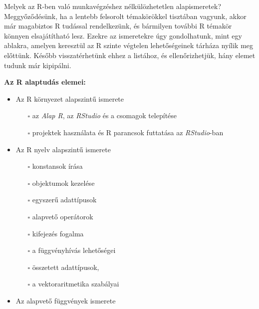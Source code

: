 \documentclass[
]{book}
\providecommand{\tightlist}{%
  \setlength{\itemsep}{0pt}\setlength{\parskip}{0pt}}
\begin{document}
Melyek az R-ben való munkavégzéshez nélkülözhetetlen alapismeretek? Meggyőződésünk, ha a lentebb felsorolt témakörökkel tisztában vagyunk, akkor már magabiztos R tudással rendelkezünk, és bármilyen további R témakör könnyen elsajátítható lesz. Ezekre az ismeretekre úgy gondolhatunk, mint egy ablakra, amelyen keresztül az R szinte végtelen lehetőségeinek tárháza nyílik meg előttünk. Később visszatérhetünk ehhez a listához, és ellenőrizhetjük, hány elemet tudunk már kipipálni.

\textbf{Az R alaptudás elemei:}

\begin{itemize}
\tightlist
\item
  Az R környezet alapszintű ismerete

  \begin{itemize}
  \tightlist
  \item[$\square$]
    az \emph{Alap R}, az \emph{RStudio} és a csomagok telepítése
  \item[$\square$]
    projektek használata és R parancsok futtatása az \emph{RStudio}-ban
  \end{itemize}
\item
  Az R nyelv alapszintű ismerete

  \begin{itemize}
  \tightlist
  \item[$\square$]
    konstansok írása
  \item[$\square$]
    objektumok kezelése
  \item[$\square$]
    egyszerű adattípusok
  \item[$\square$]
    alapvető operátorok
  \item[$\square$]
    kifejezés fogalma
  \item[$\square$]
    a függvényhívás lehetőségei
  \item[$\square$]
    összetett adattípusok,
  \item[$\square$]
    a vektoraritmetika szabályai
  \end{itemize}
\item
  Az alapvető függvények ismerete


\end{itemize}
\end{document}
